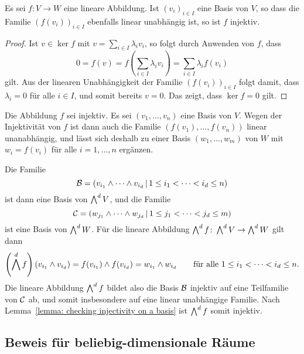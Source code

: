\begin{lemma}
  \label{lemma: checking injectivity on a basis}
  Es sei $f \colon V \to W$ eine lineare Abbildung.
  Ist $(v_i)_{i \in I}$ eine Basis von $V$, so dass die Familie $(f(v_i))_{i \in I}$ ebenfalls linear unabhängig ist, so ist $f$ injektiv.
\end{lemma}

\begin{proof}
  Ist $v \in \ker f$ mit $v = \sum_{i \in I} \lambda_i v_i$, so folgt durch Anwenden von $f$, dass
  \[
      0
    = f(v)
    = f\left( \sum_{i \in I} \lambda_i v_i \right)
    = \sum_{i \in I} \lambda_i f(v_i)
  \]
  gilt.
  Aus der linearen Unabhängigkeit der Familie $(f(v_i))_{i \in I}$ folgt damit, dass $\lambda_i = 0$ für alle $i \in I$, und somit bereits $v = 0$.
  Das zeigt, dass $\ker f = 0$ gilt.
\end{proof}

Die Abbildung $f$ sei injektiv.
Es sei $(v_1, \dotsc, v_n)$ eine Basis von $V$.
Wegen der Injektivität von $f$ ist dann auch die Familie $(f(v_1), \dotsc, f(v_n))$ linear unanabhängig, und lässt sich deshalb zu einer Basis $(w_1, \dotsc, w_m)$ von $W$ mit $w_i = f(v_i)$ für alle $i = 1, \dotsc, n$ ergänzen.

Die Familie
\[
    \mathcal{B}
  = (
      v_{i_1} \wedge \dotsb \wedge v_{i_d}
      \,|\,
      1 \leq i_1 < \dotsb < i_d \leq n
    )
\]
ist dann eine Basis von $\bigwedge^{d} V$, und die Familie
\[
    \mathcal{C}
  = (
      w_{j_1} \wedge \dotsb \wedge w_{j_d}
      \,|\,
      1 \leq j_1 < \dotsb < j_d \leq m
    )
\]
ist eine Basis von $\bigwedge^{d} W$.
Für die lineare Abbildung $\bigwedge^{d} f \colon \bigwedge^{d} V \to \bigwedge^{d} W$ gilt dann
\[
    \left(\bigwedge^{d} f\right)(v_{i_1} \wedge v_{i_d})
  = f(v_{i_1}) \wedge f(v_{i_d})
  = w_{i_1} \wedge w_{i_d}
  \qquad
  \text{für alle $1 \leq i_1 < \dotsb < i_d \leq n$}.
\]
Die lineare Abbildung $\bigwedge^{d} f$ bildet also die Basis $\mathcal{B}$ injektiv auf eine Teilfamilie von $\mathcal{C}$ ab, und somit insbesondere auf eine linear unabhängige Familie.
Nach Lemma~\ref{lemma: checking injectivity on a basis} ist $\bigwedge^{d} f$ somit injektiv.



\subsection{Beweis für beliebig-dimensionale Räume}

